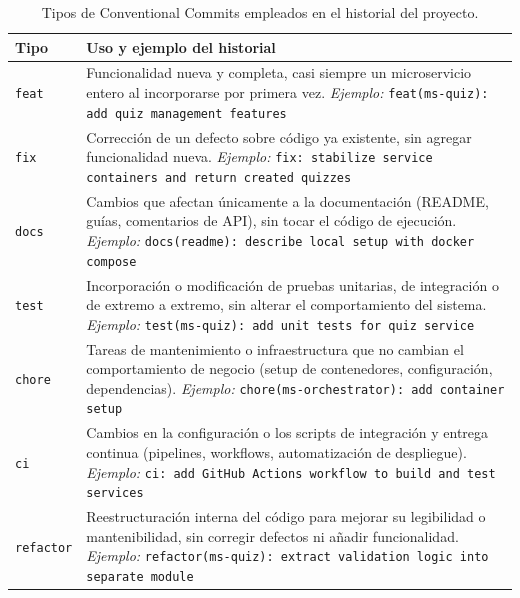 \documentclass[12pt,a4paper]{article}
\begin{document}
\begin{table}[htbp]
  \centering
  \caption{Tipos de Conventional Commits empleados en el historial del proyecto.}
  \label{tab:tipos-commit}
  \begin{tabularx}{\textwidth}{lX}
    \toprule
    \textbf{Tipo} & \textbf{Uso y ejemplo del historial} \\
    \midrule
    \texttt{feat}
      & Funcionalidad nueva y completa, casi siempre un microservicio entero al
        incorporarse por primera vez.\newline
        \emph{Ejemplo:} \texttt{feat(ms-quiz): add quiz management features} \\
    \addlinespace
    \texttt{fix}
      & Corrección de un defecto sobre código ya existente, sin agregar
        funcionalidad nueva.\newline
        \emph{Ejemplo:} \texttt{fix: stabilize service containers and return
        created quizzes} \\
    \addlinespace
    \texttt{docs}
      & Cambios que afectan únicamente a la documentación (README, guías,
        comentarios de API), sin tocar el código de ejecución.\newline
        \emph{Ejemplo:} \texttt{docs(readme): describe local setup with
        docker compose} \\
    \addlinespace
    \texttt{test}
      & Incorporación o modificación de pruebas unitarias, de integración o de
        extremo a extremo, sin alterar el comportamiento del sistema.\newline
        \emph{Ejemplo:} \texttt{test(ms-quiz): add unit tests for quiz
        service} \\
    \addlinespace
    \texttt{chore}
      & Tareas de mantenimiento o infraestructura que no cambian el
        comportamiento de negocio (setup de contenedores, configuración,
        dependencias).\newline
        \emph{Ejemplo:} \texttt{chore(ms-orchestrator): add container setup} \\
    \addlinespace
    \texttt{ci}
      & Cambios en la configuración o los scripts de integración y entrega
        continua (pipelines, workflows, automatización de despliegue).\newline
        \emph{Ejemplo:} \texttt{ci: add GitHub Actions workflow to build and
        test services} \\
    \addlinespace
    \texttt{refactor}
      & Reestructuración interna del código para mejorar su legibilidad o
        mantenibilidad, sin corregir defectos ni añadir funcionalidad.\newline
        \emph{Ejemplo:} \texttt{refactor(ms-quiz): extract validation logic
        into separate module} \\
    \bottomrule
  \end{tabularx}
\end{table}
\end{document}
